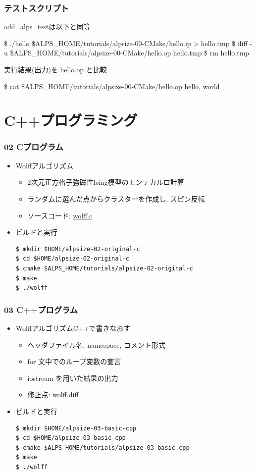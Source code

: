 \begin{frame}[fragile]
  \frametitle{テストスクリプト}
add\_alps\_testは以下と同等
\begin{semiverbatim}
\$ ./hello \$ALPS_HOME/tutorials/alpsize-00-CMake/hello.ip > hello.tmp
\$ diff -u \$ALPS_HOME/tutorials/alpsize-00-CMake/hello.op hello.tmp
\$ rm hello.tmp
\end{semiverbatim}
実行結果(出力)を hello.op と比較
\begin{semiverbatim}
\$ cat \$ALPS_HOME/tutorials/alpsize-00-CMake/hello.op
hello, world
\end{semiverbatim}
\end{frame}

\section{C++プログラミング}
\begin{frame}[fragile]
  \frametitle{02 Cプログラム}
  \begin{itemize}
    \item Wolffアルゴリズム
      \begin{itemize}
        \item 2次元正方格子強磁性Ising模型のモンテカルロ計算
        \item ランダムに選んだ点からクラスターを作成し, スピン反転
        \item ソースコード: \href{https://github.com/cmsi/alps-tutorial/blob/develop/alpsize/02-wolff.c}{wolff.c}
      \end{itemize}
    \item ビルドと実行
\begin{lstlisting}
$ mkdir $HOME/alpsize-02-original-c
$ cd $HOME/alpsize-02-original-c
$ cmake $ALPS_HOME/tutorials/alpsize-02-original-c
$ make
$ ./wolff
\end{lstlisting}
\end{itemize}
\end{frame}

\begin{frame}[fragile]
  \frametitle{03 C++プログラム}
  \begin{itemize}
    \item WolffアルゴリズムC++で書きなおす
      \begin{itemize}
        \item ヘッダファイル名, namespace, コメント形式
        \item for 文中でのループ変数の宣言
        \item iostream を用いた結果の出力
        \item 修正点: \href{https://github.com/cmsi/alps-tutorial/blob/develop/alpsize/03-wolff.diff}{wolff.diff}
      \end{itemize}
    \item ビルドと実行
\begin{lstlisting}
$ mkdir $HOME/alpsize-03-basic-cpp
$ cd $HOME/alpsize-03-basic-cpp
$ cmake $ALPS_HOME/tutorials/alpsize-03-basic-cpp
$ make
$ ./wolff
\end{lstlisting}
  \end{itemize}
\end{frame}

